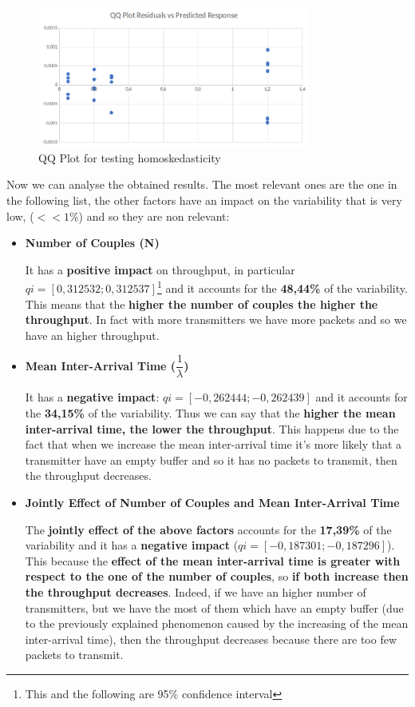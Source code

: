 \begin{figure}[H]
	\centering
	\includegraphics[width=0.8\textwidth]{img/homoskedasticity_2kr_throughput.png}
	\caption{QQ Plot for testing homoskedasticity}
	\label {img: homoskedasticity_throughput}
\end{figure}

\noindent Now we can analyse the obtained results. The most relevant ones are the one in the following list, the other factors have an impact on the variability that is very low, ($<<1\%$) and so they are non relevant:

\begin{itemize}
	\item \textbf{Number of Couples (N)}
	
	\noindent It has a \textbf{positive impact} on throughput, in particular $qi = [0,312532; 0,312537]$\footnote{This and the following are 95\% confidence interval} and it accounts for the \textbf{48,44\%} of the variability. This means that the \textbf{higher the number of couples the higher the throughput}. In fact with more transmitters we have more packets and so we have an higher throughput.
	 
	\item \textbf{Mean Inter-Arrival Time ($\dfrac{1}{\lambda}$)}
	
	\noindent It has a \textbf{negative impact}: $qi = [-0,262444; -0,262439]$ and it accounts for the \textbf{34,15\%} of the variability. Thus we can say that the \textbf{higher the mean inter-arrival time, the lower the throughput}. This happens due to the fact that when we increase the mean inter-arrival time it's more likely that a transmitter have an empty buffer and so it has no packets to transmit, then the throughput decreases. 
	
	\item \textbf{Jointly Effect of Number of Couples and Mean Inter-Arrival Time}
	
	\noindent The \textbf{jointly effect of the above factors} accounts for the \textbf{17,39\%} of the variability and it has a \textbf{negative impact} ($qi = [-0,187301; -0,187296]$). This because the \textbf{effect of the mean inter-arrival time is greater with respect to the one of the number of couples}, so \textbf{if both increase then the throughput decreases}. Indeed, if we have an higher number of transmitters, but we have the most of them which have an empty buffer (due to the previously explained phenomenon caused by the increasing of the mean inter-arrival time), then the throughput decreases because there are too few packets to transmit.
\end{itemize}


